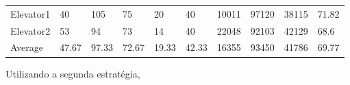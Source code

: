 \documentclass[a4paper]{article}
\begin{document}
\begin{table}[h]
\begin{tabular}{@{}llllllllll@{}}
Elevator1 & 40        & 105            & 75           & 20                                                               & 40                                                                  & 10011                                                         & 97120                                                 & 38115                                                   & 71.82        \\
Elevator2 & 53       & 94            & 73           & 14                                                               & 40                                                                  & 22048                                                         & 92103                                                 & 42129                                                   & 68.6         \\
Average   & 47.67     & 97.33         & 72.67        & 19.33                                                               & 42.33                                                               & 16355                                                         & 93450                                                 &   41786                                                 & 69.77         \\ \bottomrule
\end{tabular}
\end{table}

\newpage

Utilizando a segunda estratégia,
\end{document}
